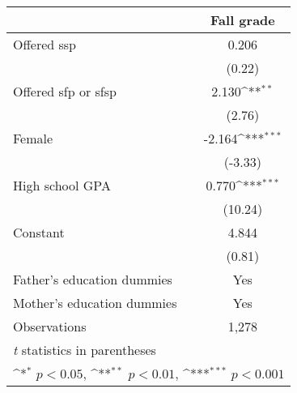 {
\def\sym#1{\ifmmode^{#1}\else\(^{#1}\)\fi}
\begin{tabular}{l*{1}{c}}
\hline\hline
          &\multicolumn{1}{c}{Fall grade}\\
\hline
Offered ssp&    0.206         \\
          &   (0.22)         \\
Offered sfp or sfsp&    2.130\sym{**} \\
          &   (2.76)         \\
Female    &   -2.164\sym{***}\\
          &  (-3.33)         \\
High school GPA&    0.770\sym{***}\\
          &  (10.24)         \\
Constant  &    4.844         \\
          &   (0.81)         \\
Father's education dummies &      Yes         \\
Mother's education dummies &      Yes         \\
\hline
Observations&    1,278         \\
\hline\hline
\multicolumn{2}{l}{\footnotesize \textit{t} statistics in parentheses}\\
\multicolumn{2}{l}{\footnotesize \sym{*} \(p<0.05\), \sym{**} \(p<0.01\), \sym{***} \(p<0.001\)}\\
\end{tabular}
}
